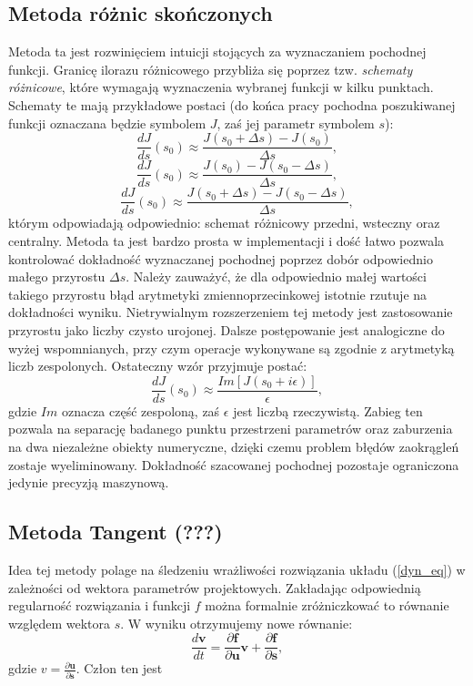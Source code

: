 \documentclass[12pt]{article}
\begin{document}
\subsection{Metoda różnic skończonych}
Metoda ta jest rozwinięciem intuicji stojących za wyznaczaniem pochodnej funkcji. Granicę ilorazu różnicowego przybliża się poprzez tzw. \textit{schematy różnicowe}, które wymagają wyznaczenia wybranej funkcji w kilku punktach. Schematy te mają przykładowe postaci (do końca pracy pochodna poszukiwanej funkcji oznaczana będzie symbolem $ J $, zaś jej parametr symbolem $ s $):
\begin{equation}
\frac{dJ}{ds}(s_{0}) \approx \frac{J(s_{0}+\Delta s) - J(s_{0})}{\Delta s},
\end{equation} 
\begin{equation}
\frac{dJ}{ds}(s_{0}) \approx \frac{J(s_{0}) - J(s_{0}-\Delta s)}{\Delta s},
\end{equation} 
\begin{equation}
\frac{dJ}{ds}(s_{0}) \approx \frac{J(s_{0}+\Delta s) - J(s_{0}-\Delta s)}{\Delta s},
\end{equation}
którym odpowiadają odpowiednio: schemat różnicowy przedni, wsteczny oraz centralny. \newline
Metoda ta jest bardzo prosta w implementacji i dość łatwo pozwala kontrolować dokładność wyznaczanej pochodnej poprzez dobór odpowiednio małego przyrostu $ \Delta s  $. Należy zauważyć, że dla odpowiednio małej wartości takiego przyrostu błąd arytmetyki zmiennoprzecinkowej istotnie rzutuje na dokładności wyniku. Nietrywialnym rozszerzeniem tej metody jest zastosowanie przyrostu jako liczby czysto urojonej. Dalsze postępowanie jest analogiczne do wyżej wspomnianych, przy czym operacje wykonywane są zgodnie z arytmetyką liczb zespolonych. Ostateczny wzór przyjmuje postać:
\begin{equation}
\frac{dJ}{ds}(s_{0}) \approx \frac{Im[J(s_{0}+i\epsilon)]}{\epsilon},
\end{equation}
gdzie $ Im $ oznacza część zespoloną, zaś $\epsilon$ jest liczbą rzeczywistą. Zabieg ten pozwala na separację badanego punktu przestrzeni parametrów oraz zaburzenia na dwa niezależne obiekty numeryczne, dzięki czemu problem błędów zaokrągleń zostaje wyeliminowany. Dokładność szacowanej pochodnej pozostaje ograniczona jedynie precyzją maszynową.
\subsection{Metoda Tangent (???)}
Idea tej metody polage na śledzeniu wrażliwości rozwiązania układu (\ref{dyn_eq}) w zależności od wektora parametrów projektowych. Zakładając odpowiednią regularność rozwiązania i funkcji $ f $ można formalnie zróżniczkować to równanie względem wektora $ s $. W wyniku otrzymujemy nowe równanie:
\begin{equation}
\frac{d{\textbf{v}}}{d{t}} = \frac{\partial{\textbf{f}}}{\partial{\textbf{u}}}\textbf{v} + \frac{\partial{\textbf{f}}}{\partial{\textbf{s}}}
\label{tangent},
\end{equation}
gdzie $ v = \frac{\partial{\textbf{u}}}{\partial{\textbf{s}}} $. Człon ten jest 
\end{document}
